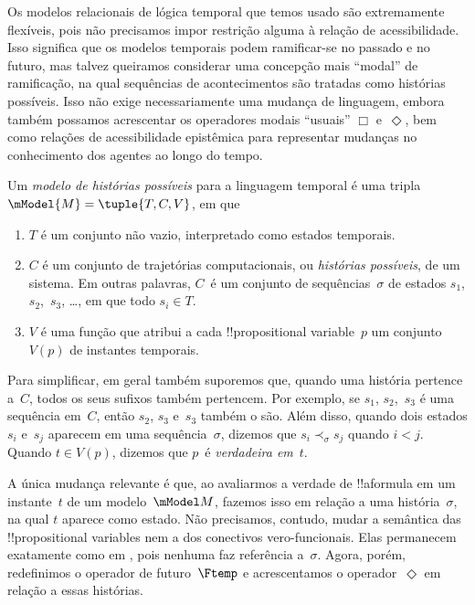 \documentclass[../../../include/open-logic-section]{subfiles}
\begin{document}


Os modelos relacionais de lógica temporal que temos usado são
extremamente flexíveis, pois não precisamos impor restrição alguma à
relação de acessibilidade. Isso significa que os modelos temporais
podem ramificar-se no passado e no futuro, mas talvez queiramos
considerar uma concepção mais ``modal'' de ramificação, na qual
sequências de acontecimentos são tratadas como histórias possíveis.
Isso não exige necessariamente uma mudança de linguagem, embora
também possamos acrescentar os operadores modais ``usuais'' $\Box$
e~$\Diamond$, bem como relações de acessibilidade epistêmica para
representar mudanças no conhecimento dos agentes ao longo do tempo.

\begin{defn}
  Um \emph{modelo de histórias possíveis} para a linguagem temporal é uma tripla
  $\mModel{M} = \tuple{T, C, V}$, em que
  \begin{enumerate}
    \item $T$ é um conjunto não vazio, interpretado como estados temporais.
    \item $C$ é um conjunto de trajetórias computacionais, ou
      \emph{histórias possíveis}, de um sistema. Em outras palavras,
      $C$~é um conjunto de sequências~$\sigma$ de estados $s_1$,
      $s_2$,~$s_3$, \dots, em que todo $s_i \in T$.
    \item $V$ é uma função que atribui a cada !!{propositional
      variable}~$p$ um conjunto~$V(p)$ de instantes temporais.
  \end{enumerate}
  Para simplificar, em geral também suporemos que, quando uma história
  pertence a~$C$, todos os seus sufixos também pertencem. Por exemplo,
  se $s_1$, $s_2$,~$s_3$ é uma sequência em~$C$, então $s_2$, $s_3$
  e~$s_3$ também o são. Além disso, quando dois estados $s_i$ e~$s_j$
  aparecem em uma sequência~$\sigma$, dizemos que
  $s_i \prec_\sigma s_j$ quando $i < j$. Quando $t \in V(p)$, dizemos
  que $p$~é \emph{verdadeira em}~$t$.
\end{defn}

A única mudança relevante é que, ao avaliarmos a verdade de
!!a{formula} em um instante~$t$ de um modelo~$\mModel M$, fazemos isso
em relação a uma história~$\sigma$, na qual $t$ aparece como estado.
Não precisamos, contudo, mudar a semântica das !!{propositional
variable}s nem a dos conectivos vero-funcionais. Elas permanecem
exatamente como em , pois nenhuma faz
referência a~$\sigma$. Agora, porém, redefinimos o operador de
futuro~$\Ftemp$ e acrescentamos o operador~$\Diamond$ em relação a
essas histórias. 
\end{document}
